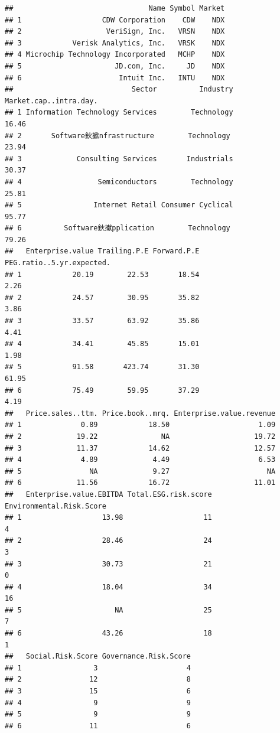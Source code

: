\documentclass[
]{article}
\begin{document}
\begin{verbatim}
##                                Name Symbol Market
## 1                   CDW Corporation    CDW    NDX
## 2                    VeriSign, Inc.   VRSN    NDX
## 3            Verisk Analytics, Inc.   VRSK    NDX
## 4 Microchip Technology Incorporated   MCHP    NDX
## 5                      JD.com, Inc.     JD    NDX
## 6                       Intuit Inc.   INTU    NDX
##                            Sector          Industry Market.cap..intra.day.
## 1 Information Technology Services        Technology                  16.46
## 2       Software鈥擨nfrastructure        Technology                  23.94
## 3             Consulting Services       Industrials                  30.37
## 4                  Semiconductors        Technology                  25.81
## 5                 Internet Retail Consumer Cyclical                  95.77
## 6          Software鈥擜pplication        Technology                  79.26
##   Enterprise.value Trailing.P.E Forward.P.E PEG.ratio..5.yr.expected.
## 1            20.19        22.53       18.54                      2.26
## 2            24.57        30.95       35.82                      3.86
## 3            33.57        63.92       35.86                      4.41
## 4            34.41        45.85       15.01                      1.98
## 5            91.58       423.74       31.30                     61.95
## 6            75.49        59.95       37.29                      4.19
##   Price.sales..ttm. Price.book..mrq. Enterprise.value.revenue
## 1              0.89            18.50                     1.09
## 2             19.22               NA                    19.72
## 3             11.37            14.62                    12.57
## 4              4.89             4.49                     6.53
## 5                NA             9.27                       NA
## 6             11.56            16.72                    11.01
##   Enterprise.value.EBITDA Total.ESG.risk.score Environmental.Risk.Score
## 1                   13.98                   11                        4
## 2                   28.46                   24                        3
## 3                   30.73                   21                        0
## 4                   18.04                   34                       16
## 5                      NA                   25                        7
## 6                   43.26                   18                        1
##   Social.Risk.Score Governance.Risk.Score
## 1                 3                     4
## 2                12                     8
## 3                15                     6
## 4                 9                     9
## 5                 9                     9
## 6                11                     6
\end{verbatim}
\end{document}

